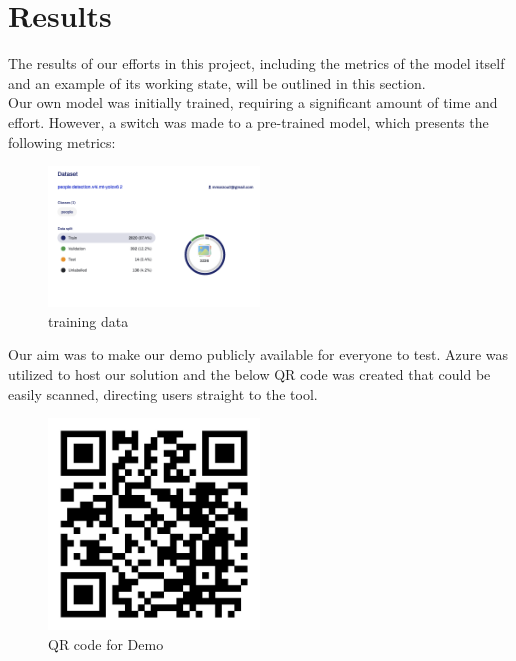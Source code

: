 \section{Results}
\label{sec:results}
The results of our efforts in this project, including the metrics of the model itself and an example of its working state, will be outlined in this section. \\

Our own model was initially trained, requiring a significant amount of time and effort. However, a switch was made to a pre-trained model, which presents the following metrics:\\
\begin{figure}[h]
    \centering
    \includegraphics[width=0.5\textwidth]{images/train.png}
    \caption{training data}
    \label{fig:data}
\end{figure}

Our aim was to make our demo publicly available for everyone to test. Azure was utilized to host our solution and the below QR code was created that could be easily scanned, directing users straight to the tool. \\
\begin{figure}[h]
    \centering
    \includegraphics[width=0.5\textwidth]{images/QR.jpeg}
    \caption{QR code for Demo}
    \label{fig:data}
\end{figure}

